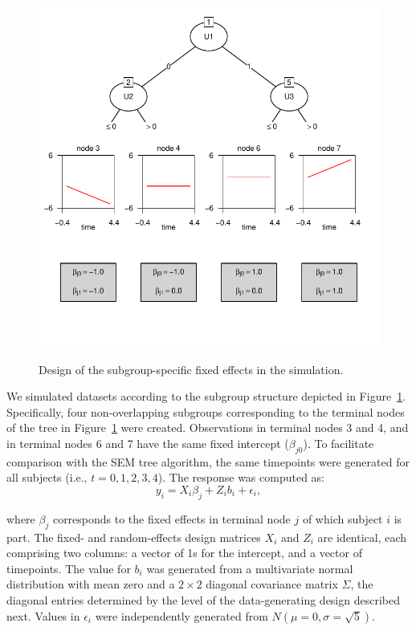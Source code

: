 \documentclass[doc,floatsintext,natbib]{apa7}
\begin{document}
\begin{figure}[!ht]
\caption{Design of the subgroup-specific fixed effects in the simulation.}
\includegraphics{_Partitioning_GCMs_with_GLMM_trees-003}
\label{fig:design_tree}
\end{figure}

We simulated datasets according to the subgroup structure depicted in Figure~\ref{fig:design_tree}. Specifically, four non-overlapping subgroups corresponding to the terminal nodes of the tree in Figure~\ref{fig:design_tree} were created. Observations in terminal nodes 3 and 4, and in terminal nodes 6 and 7 have the same fixed intercept ($\beta_{j0}$). To facilitate comparison with the SEM tree algorithm, the same timepoints were generated for all subjects (i.e., $t = 0, 1, 2, 3, 4$). The response was computed as:\\

$$y_{i} =  X_{i} \beta_{j} + Z_{i} b_i + \epsilon_{i},$$

\noindent where $\beta_j$ corresponds to the fixed effects in terminal node $j$ of which subject $i$ is part. The fixed- and random-effects design matrices $X_i$ and $Z_i$ are identical, each comprising two columns: a vector of 1s for the intercept, and a vector of timepoints. The value for $b_i$ was generated from a multivariate normal distribution with mean zero and a $2 \times 2$ diagonal covariance matrix $\Sigma$, the diagonal entries determined by the level of the data-generating design described next. Values in $\epsilon_{i}$ were independently generated from $N(\mu = 0, \sigma = \sqrt{5})$.   
\end{document}
